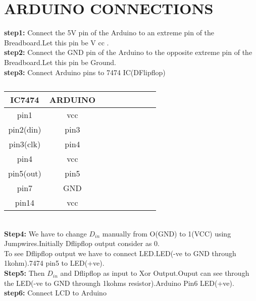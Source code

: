 \documentclass[a4paper,11pt,twocolumn]{article}
\begin{document}
\section{ARDUINO CONNECTIONS}
\textbf{step1:} Connect the 5V pin of the Arduino to an extreme pin of the Breadboard.Let this pin be V cc .\\
\newline
\textbf{step2:} Connect the GND pin of the Arduino to the opposite extreme pin of the Breadboard.Let this pin be Ground.\\
\newline
\textbf{step3:} Connect Arduino pins to 7474 IC(DFlipflop) \\
\begin{table}[ht!] 
    \centering 
    \begin{tabular}{|c|c|c|c|c|c|c|c|c|} 
    \hline 
	    IC7474&ARDUINO  \\ 
         \hline 
	    pin1     &vcc \\
	    pin2(din)&pin3 \\
	    pin3(clk)&pin4 \\
	    pin4 & vcc \\
	    pin5(out) &pin5 \\
	    pin7 & GND \\
	    pin14 & vcc \\
         \hline 
    \end{tabular} 
\caption{} 
\end{table}
\\
\textbf{Step4:} We have to change $D_{in} $ manually from O(GND) to 1(VCC) using Jumpwires.Initially Dflipflop output consider as 0.\\
To see Dflipflop output we have to connect LED.LED(-ve to GND through 1kohm).7474 pin5 to LED(+ve).\\
\newline
\textbf{Step5:} Then $D_{in}$ and Dflipflop as input to Xor Output.Ouput can see through the LED(-ve to GND throungh 1kohms resistor).Arduino Pin6 LED(+ve).\\
\newline
\textbf{step6:} Connect LCD to Arduino \\
\end{document}
